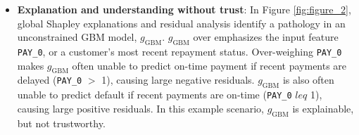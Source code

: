 \documentclass[fleqn]{article}
\begin{document}
\begin{itemize}

\item \textbf{Explanation and understanding without trust}: In Figure \ref{fig:figure_2}, global Shapley explanations and residual analysis identify a pathology in an unconstrained GBM model, $g_{\text{GBM}}$. $g_{\text{GBM}}$ over emphasizes the input feature \texttt{PAY\_0}, or a customer's most recent repayment status. Over-weighing \texttt{PAY\_0} makes $g_{\text{GBM}}$ often unable to predict on-time payment if recent payments are delayed (\texttt{PAY\_0} $>$ 1), causing large negative residuals. $g_{\text{GBM}}$ is also often unable to predict default if recent payments are on-time (\texttt{PAY\_0} $leq$ 1), causing large positive residuals. In this example scenario, $g_{\text{GBM}}$ is explainable, but not trustworthy. 


\end{itemize}
\end{document}
